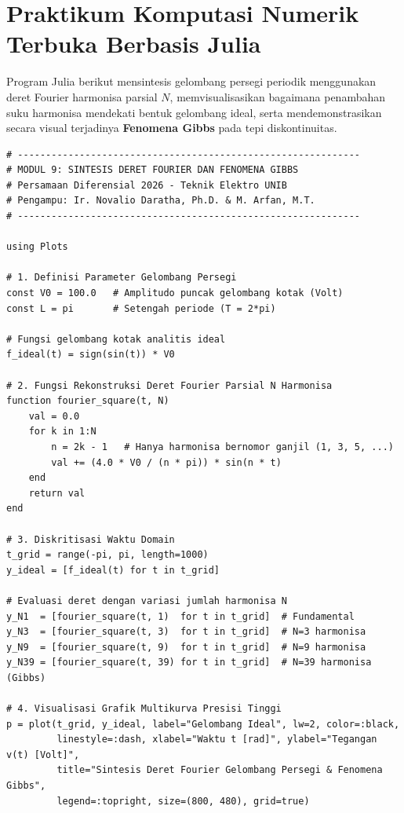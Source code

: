 \documentclass[11pt,a4paper]{article}
\theoremstyle{definition}
\begin{document}
\section{Praktikum Komputasi Numerik Terbuka Berbasis Julia}

Program Julia berikut mensintesis gelombang persegi periodik menggunakan deret Fourier harmonisa parsial $N$, memvisualisasikan bagaimana penambahan suku harmonisa mendekati bentuk gelombang ideal, serta mendemonstrasikan secara visual terjadinya \textbf{Fenomena Gibbs} pada tepi diskontinuitas.

\begin{lstlisting}[style=juliastyle, caption={Skrip Julia sintesis Deret Fourier dan demonstrasi Fenomena Gibbs.}, label={lst:julia_fourier_gibbs}]
# -------------------------------------------------------------
# MODUL 9: SINTESIS DERET FOURIER DAN FENOMENA GIBBS
# Persamaan Diferensial 2026 - Teknik Elektro UNIB
# Pengampu: Ir. Novalio Daratha, Ph.D. & M. Arfan, M.T.
# -------------------------------------------------------------

using Plots

# 1. Definisi Parameter Gelombang Persegi
const V0 = 100.0   # Amplitudo puncak gelombang kotak (Volt)
const L = pi       # Setengah periode (T = 2*pi)

# Fungsi gelombang kotak analitis ideal
f_ideal(t) = sign(sin(t)) * V0

# 2. Fungsi Rekonstruksi Deret Fourier Parsial N Harmonisa
function fourier_square(t, N)
    val = 0.0
    for k in 1:N
        n = 2k - 1   # Hanya harmonisa bernomor ganjil (1, 3, 5, ...)
        val += (4.0 * V0 / (n * pi)) * sin(n * t)
    end
    return val
end

# 3. Diskritisasi Waktu Domain
t_grid = range(-pi, pi, length=1000)
y_ideal = [f_ideal(t) for t in t_grid]

# Evaluasi deret dengan variasi jumlah harmonisa N
y_N1  = [fourier_square(t, 1)  for t in t_grid]  # Fundamental
y_N3  = [fourier_square(t, 3)  for t in t_grid]  # N=3 harmonisa
y_N9  = [fourier_square(t, 9)  for t in t_grid]  # N=9 harmonisa
y_N39 = [fourier_square(t, 39) for t in t_grid]  # N=39 harmonisa (Gibbs)

# 4. Visualisasi Grafik Multikurva Presisi Tinggi
p = plot(t_grid, y_ideal, label="Gelombang Ideal", lw=2, color=:black,
         linestyle=:dash, xlabel="Waktu t [rad]", ylabel="Tegangan v(t) [Volt]",
         title="Sintesis Deret Fourier Gelombang Persegi & Fenomena Gibbs",
         legend=:topright, size=(800, 480), grid=true)


\end{lstlisting}
\end{document}
